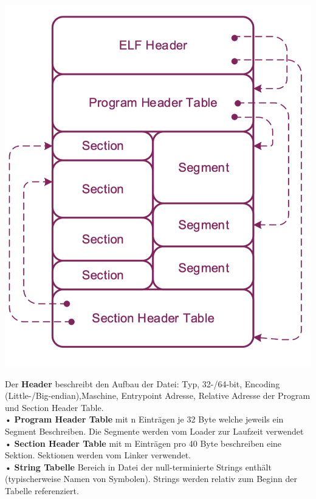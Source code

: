 \documentclass[8pt]{extarticle}
\let\oldtextbf\textbf
\renewcommand{\textbf}{\tiny\oldtextbf}
\begin{document}
\begin{multicols*}{5}
	\includegraphics[scale=0.2]{ELF.png}
			
	Der \textbf{Header} beschreibt den Aufbau der Datei: Typ, 32-/64-bit, Encoding (Little-/Big-endian),Maschine, Entrypoint Adresse, Relative Adresse der Program und Section Header Table.\\
	• \textbf{Program Header Table} mit n Einträgen je 32 Byte welche jeweils ein Segment Beschreiben. Die Segmente werden vom Loader zur Laufzeit verwendet\\
	• \textbf{Section Header Table} mit m Einträgen pro 40 Byte beschreiben eine Sektion. Sektionen werden vom Linker verwendet.\\
	• \textbf{String Tabelle} Bereich in Datei der null-terminierte Strings enthält (typischerweise Namen von Symbolen). Strings werden relativ zum Beginn der Tabelle referenziert.\\
			

\end{multicols*}
\end{document}
